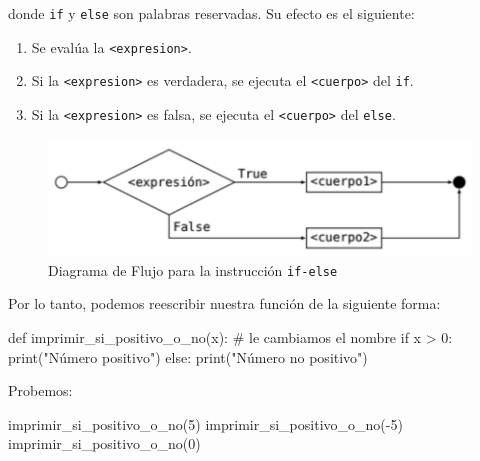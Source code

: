 \documentclass[
  letterpaper,
  DIV=11,
  numbers=noendperiod]{scrreprt}
\newenvironment{Shaded}{\begin{snugshade}}{\end{snugshade}}
\newcommand{\BuiltInTok}[1]{\textcolor[rgb]{0.00,0.23,0.31}{#1}}
\newcommand{\CommentTok}[1]{\textcolor[rgb]{0.37,0.37,0.37}{#1}}
\newcommand{\ControlFlowTok}[1]{\textcolor[rgb]{0.00,0.23,0.31}{#1}}
\newcommand{\DecValTok}[1]{\textcolor[rgb]{0.68,0.00,0.00}{#1}}
\newcommand{\KeywordTok}[1]{\textcolor[rgb]{0.00,0.23,0.31}{#1}}
\newcommand{\NormalTok}[1]{\textcolor[rgb]{0.00,0.23,0.31}{#1}}
\newcommand{\OperatorTok}[1]{\textcolor[rgb]{0.37,0.37,0.37}{#1}}
\newcommand{\StringTok}[1]{\textcolor[rgb]{0.13,0.47,0.30}{#1}}
\providecommand{\tightlist}{%
  \setlength{\itemsep}{0pt}\setlength{\parskip}{0pt}}\usepackage{longtable,booktabs,array}
\begin{document}
donde \texttt{if} y \texttt{else} son palabras reservadas. Su efecto es
el siguiente:

\begin{enumerate}
\def\labelenumi{\arabic{enumi}.}
\tightlist
\item
  Se evalúa la \texttt{\textless{}expresion\textgreater{}}.
\item
  Si la \texttt{\textless{}expresion\textgreater{}} es verdadera, se
  ejecuta el \texttt{\textless{}cuerpo\textgreater{}} del \texttt{if}.
\item
  Si la \texttt{\textless{}expresion\textgreater{}} es falsa, se ejecuta
  el \texttt{\textless{}cuerpo\textgreater{}} del \texttt{else}.
\end{enumerate}

\begin{figure}

{\centering \includegraphics{imgs/unidad_3/if-else.png}

}

\caption{Diagrama de Flujo para la instrucción \texttt{if-else}}

\end{figure}

Por lo tanto, podemos reescribir nuestra función de la siguiente forma:

\begin{Shaded}
\begin{Highlighting}[]
\KeywordTok{def}\NormalTok{ imprimir\_si\_positivo\_o\_no(x): }\CommentTok{\# le cambiamos el nombre}
  \ControlFlowTok{if}\NormalTok{ x }\OperatorTok{\textgreater{}} \DecValTok{0}\NormalTok{:}
      \BuiltInTok{print}\NormalTok{(}\StringTok{"Número positivo"}\NormalTok{)}
  \ControlFlowTok{else}\NormalTok{:}
      \BuiltInTok{print}\NormalTok{(}\StringTok{"Número no positivo"}\NormalTok{)}
\end{Highlighting}
\end{Shaded}

Probemos:

\begin{Shaded}
\begin{Highlighting}[]
\NormalTok{imprimir\_si\_positivo\_o\_no(}\DecValTok{5}\NormalTok{)}
\NormalTok{imprimir\_si\_positivo\_o\_no(}\OperatorTok{{-}}\DecValTok{5}\NormalTok{)}
\NormalTok{imprimir\_si\_positivo\_o\_no(}\DecValTok{0}\NormalTok{)}
\end{Highlighting}
\end{Shaded}
\end{document}
